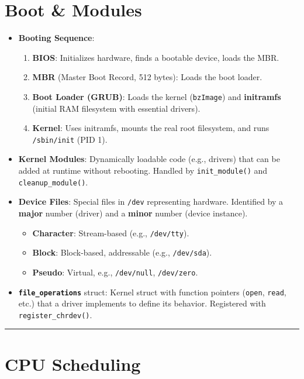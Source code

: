 \documentclass[8pt,a4paper]{article}
\newcommand{\sectiondivider}{\vspace{4pt}\hrule\vspace{4pt}}
\begin{document}
\begin{multicols}{2}
\section*{Boot \& Modules}
\begin{itemize}
    \item \textbf{Booting Sequence}:
    \begin{enumerate}
        \item \textbf{BIOS}: Initializes hardware, finds a bootable device, loads the MBR.
        \item \textbf{MBR} (Master Boot Record, 512 bytes): Loads the boot loader.
        \item \textbf{Boot Loader (GRUB)}: Loads the kernel (\texttt{bzImage}) and \textbf{initramfs} (initial RAM filesystem with essential drivers).
        \item \textbf{Kernel}: Uses initramfs, mounts the real root filesystem, and runs \texttt{/sbin/init} (PID 1).
    \end{enumerate}
    \item \textbf{Kernel Modules}: Dynamically loadable code (e.g., drivers) that can be added at runtime without rebooting. Handled by \texttt{init\_module()} and \texttt{cleanup\_module()}.
    \item \textbf{Device Files}: Special files in \texttt{/dev} representing hardware. Identified by a \textbf{major} number (driver) and a \textbf{minor} number (device instance).
    \begin{itemize}
        \item \textbf{Character}: Stream-based (e.g., \texttt{/dev/tty}).
        \item \textbf{Block}: Block-based, addressable (e.g., \texttt{/dev/sda}).
        \item \textbf{Pseudo}: Virtual, e.g., \texttt{/dev/null}, \texttt{/dev/zero}.
    \end{itemize}
    \item \textbf{\texttt{file\_operations}} struct: Kernel struct with function pointers (\texttt{open}, \texttt{read}, etc.) that a driver implements to define its behavior. Registered with \texttt{register\_chrdev()}.
\end{itemize}

\sectiondivider
\section*{CPU Scheduling}

\end{multicols}
\end{document}
